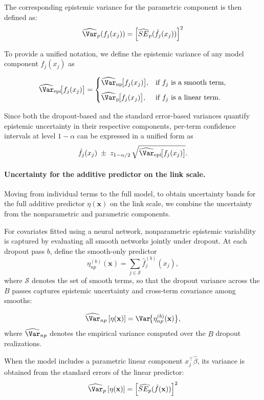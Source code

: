 The corresponding epistemic variance for the parametric component is then defined as: 
\[
\widehat{\Var}_p(f_j(x_j)) = \left[ \widehat{SE}_p(\hat f_j(x_j)) \right]^2
\]

To provide a unified notation, we define the epistemic variance of any model component $f_j(x_j)$ as

\[
\widehat{\Var}_{\mathrm{epi}}\!\bigl[f_j(x_j)\bigr] =
\begin{cases}
\widehat{\Var}_{\mathrm{np}}\!\bigl[f_j(x_j)\bigr], & \text{if $f_j$ is a smooth term},\\[6pt]
\widehat{\Var}_{\mathrm{p}}\!\bigl[f_j(x_j)\bigr], & \text{if $f_j$ is a linear term.}
\end{cases}
\]

Since both the dropout-based and the standard error-based variances quantify epistemic uncertainty in their respective components, per-term confidence intervals at level $1-\alpha$ can be expressed in a unified form as
\[
\hat f_j(x_j)\;\pm\;
z_{1-\alpha/2}\,
\sqrt{\widehat{\Var}_{\mathrm{epi}}\!\bigl[f_j(x_j)\bigr]}.
\]

\paragraph{Uncertainty for the additive predictor on the link scale.}

Moving from individual terms to the full model, to obtain uncertainty bands for the full additive predictor
$\eta(\mathbf{x})$ on the link scale, we combine the uncertainty from the nonparametric and parametric components. 

For covariates fitted using a neural network, nonparametric epistemic variability is captured by evaluating all smooth networks jointly under dropout. At each dropout pass $b$, define the smooth-only predictor
\[
\eta_{np}^{(b)}(\mathbf{x}) = \sum_{j\in\mathcal{S}} \hat f_j^{(b)}(x_j),
\]
where $\mathcal{S}$ denotes the set of smooth terms, so that the dropout variance across the $B$ passes captures epistemic uncertainty and cross-term covariance among smooths:

\[
\widehat{\Var}_{np} \left[{\eta(\mathbf{x})} \right] = \Var\!\bigl\{\eta_{np}^{(b)}(\mathbf{x})\bigr\},
\]
where $\widehat{\Var}_{np}$ denotes the empirical variance computed over the $B$ dropout realizations.

When the model includes a parametric linear component $x_j^\top \hat\beta$, its variance is obtained from the standard errors of the linear predictor: 
\[
\widehat{\Var}_p\left[\eta(\mathbf{x})\right] = \left[ \widehat{SE_p}(\hat f(\mathbf{x})) \right]^2
\]

